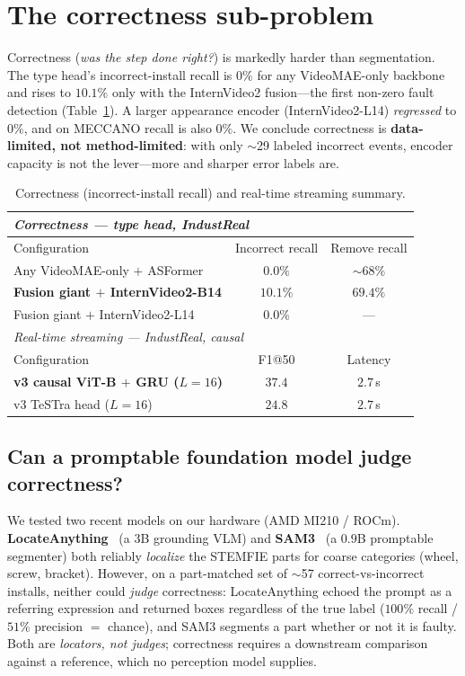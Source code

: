 \documentclass[11pt]{article}
\newcommand{\best}[1]{\textcolor{best}{\textbf{#1}}}
\begin{document}
\section{The correctness sub-problem}
\label{sec:correct}
Correctness (\emph{was the step done right?}) is markedly harder than segmentation. The type head's
incorrect-install recall is $0\%$ for any VideoMAE-only backbone and rises to \textbf{$10.1\%$} only with the
InternVideo2 fusion---the first non-zero fault detection (Table~\ref{tab:extra}). A larger appearance encoder
(InternVideo2-L14) \emph{regressed} to $0\%$, and on MECCANO recall is also $0\%$. We conclude correctness is
\textbf{data-limited, not method-limited}: with only $\sim$29 labeled incorrect events, encoder capacity is not
the lever---more and sharper error labels are.

\begin{table}[H]
\centering
\caption{Correctness (incorrect-install recall) and real-time streaming summary.}
\label{tab:extra}
\small
\begin{tabular}{lcc}
\toprule
\multicolumn{3}{l}{\textit{Correctness --- type head, IndustReal}} \\
\midrule
Configuration & Incorrect recall & Remove recall \\
Any VideoMAE-only $+$ ASFormer & $0.0\%$ & $\sim$68\% \\
\best{Fusion giant $+$ InternVideo2-B14} & \best{$10.1\%$} & $69.4\%$ \\
Fusion giant $+$ InternVideo2-L14 & $0.0\%$ & --- \\
\midrule
\multicolumn{3}{l}{\textit{Real-time streaming --- IndustReal, causal}} \\
\midrule
Configuration & F1@50 & Latency \\
\best{v3 causal ViT-B $+$ GRU ($L{=}16$)} & \best{$37.4$} & $2.7$\,s \\
v3 TeSTra head ($L{=}16$) & $24.8$ & $2.7$\,s \\
\bottomrule
\end{tabular}
\end{table}

\subsection{Can a promptable foundation model judge correctness?}
We tested two recent models on our hardware (AMD MI210 / ROCm). \textbf{LocateAnything}~\cite{locateanything}
(a $3$B grounding VLM) and \textbf{SAM3}~\cite{sam3} (a $0.9$B promptable segmenter) both reliably
\emph{localize} the STEMFIE parts for coarse categories (wheel, screw, bracket). However, on a part-matched set
of $\sim$57 correct-vs-incorrect installs, neither could \emph{judge} correctness: LocateAnything echoed the
prompt as a referring expression and returned boxes regardless of the true label ($100\%$ recall / $51\%$
precision $=$ chance), and SAM3 segments a part whether or not it is faulty. Both are \emph{locators, not judges};
correctness requires a downstream comparison against a reference, which no perception model supplies.
\end{document}
